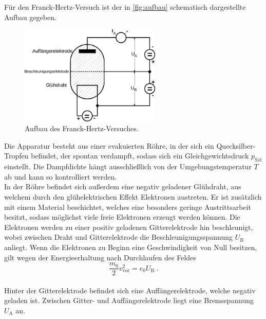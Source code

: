     Für den Franck-Hertz-Versuch ist der in \autoref{fig:aufbau} schematisch dargestellte Aufbau gegeben.
    \begin{figure}[H]
        \centering
        \includegraphics[width=0.6\textwidth]{content/img/Abb_1.pdf}
        \caption{Aufbau des Franck-Hertz-Versuches. \cite{versuchsanleitung}}
        \label{fig:aufbau}
    \end{figure}
    Die Apparatur besteht aus einer evakuierten Röhre,
    in der sich ein Quecksilber-Tropfen befindet,
    der spontan verdampft, %
    sodass sich ein Gleichgewichtsdruck $p_\text{Sät}$ einstellt.
    Die Dampfdichte hängt ausschließlich von der Umgebungstemperatur $T$ ab
    und kann so kontrolliert werden.\\
    In der Röhre befindet sich außerdem eine negativ geladener Glühdraht,
    aus welchem durch den glühelektrischen Effekt Elektronen austreten.
    Er ist zusätzlich mit einem Material beschichtet,
    welches eine besonders geringe Austrittsarbeit besitzt,
    sodass möglichst viele freie Elektronen erzeugt werden können.
    Die Elektronen werden zu einer positiv geladenen Gitterelektrode hin beschleunigt,
    wobei zwischen Draht und Gitterelektrode die Beschleunigungsspannung $U_\text{B}$ anliegt.
    Wenn die Elektronen zu Beginn eine Geschwindigkeit von Null besitzen,
    gilt wegen der Energieerhaltung nach Durchlaufen des Feldes
    \begin{equation*}
        \frac{m_0}{2}v^2_\text{vor} = e_0 U_\text{B} \ .
    \end{equation*}
    \\
    Hinter der Gitterelektrode befindet sich eine Auffängerelektrode,
    welche negativ geladen ist.
    Zwischen Gitter- und Auffängerelektrode liegt eine Bremsspannung $U_\text{A}$ an.

